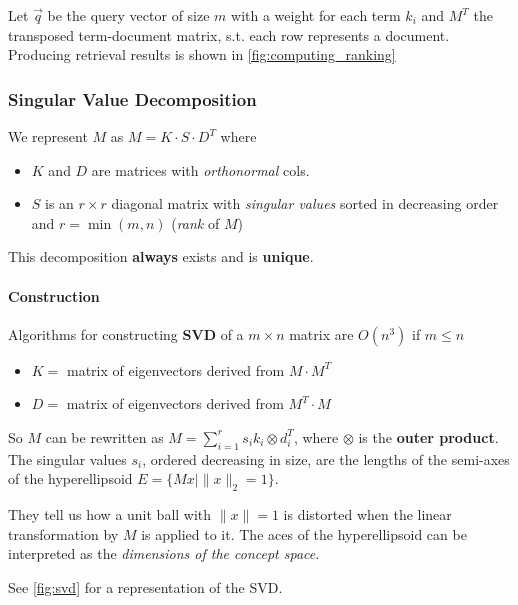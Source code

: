 Let $\vec{q}$ be the query vector of size $m$ with a weight for each term $k_i$ and $M^T$ the transposed term-document matrix, s.t. each row represents a document. Producing retrieval results is shown in \cref{fig:computing_ranking}

\subsubsection{Singular Value Decomposition}
We represent $M$ as $M = K \cdot S \cdot D^T$ where
\begin{itemize}
  \item $K$ and $D$ are matrices with \emph{orthonormal} cols.
  \item $S$ is an $r \times r$ diagonal matrix with \emph{singular values} sorted in decreasing order and $r = \min (m, n)$ (\emph{rank} of $M$)
\end{itemize}
This decomposition \textbf{always} exists and is \textbf{unique}.

\paragraph{Construction} Algorithms for constructing \textbf{SVD} of a $m \times n$ matrix are $O(n^3)$ if $m \leq n$
\begin{itemize}
  \item $K = $ matrix of eigenvectors derived from $M \cdot M^T$
  \item $D = $ matrix of eigenvectors derived from $M^T \cdot M$
\end{itemize}

So $M$ can be rewritten as $M = \sum_{i=1}^r s_i k_i \otimes d_i^T$, where $\otimes$ is the \textbf{outer product}. The singular values $s_i$, ordered decreasing in size, are the lengths of the semi-axes of the hyperellipsoid $E = \{ Mx | \|x\|_2 = 1 \}$.

They tell us how a unit ball with $\|x\| = 1$ is distorted when the linear transformation by $M$ is applied to it. The aces of the hyperellipsoid can be interpreted as the \emph{dimensions of the concept space}.

See \cref{fig:svd} for a representation of the SVD.


